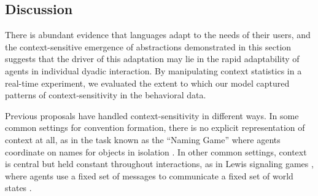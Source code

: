 
%

\subsection{Discussion}

There is abundant evidence that languages adapt to the needs of their users, and the context-sensitive emergence of abstractions demonstrated in this section suggests that the driver of this adaptation may lie in the rapid adaptability of agents in individual dyadic interaction. 
By manipulating context statistics in a real-time experiment, we evaluated the extent to which our model captured patterns of context-sensitivity in the behavioral data.

Previous proposals have handled context-sensitivity in different ways.
In some common settings for convention formation, there is no explicit representation of context at all, as in the task known as the ``Naming Game'' where agents coordinate on names for objects in isolation \cite{steels2012experiments,baronchelli2008depth}. 
In other common settings, context is central but held constant throughout interactions, as in Lewis signaling games \cite{lewis_convention:_1969}, where agents use a fixed set of messages to communicate a fixed set of world states \cite{skyrms2010signals,BrunerEtAl14_LewisConventions}.

